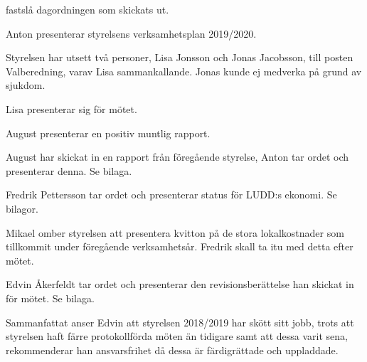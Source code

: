 \documentclass{protokoll}
\begin{document}
\newpage  


\begin{beslut}
     \att fastslå dagordningen som skickats ut.
\end{beslut}


Anton presenterar styrelsens verksamhetsplan 2019/2020. 

Styrelsen har utsett två personer, Lisa Jonsson och Jonas Jacobsson, till 
posten Valberedning, varav Lisa sammankallande. Jonas kunde ej medverka på
grund av sjukdom. 

Lisa presenterar sig för mötet. 


August presenterar en positiv muntlig rapport.

August har skickat in en rapport från föregående styrelse, Anton tar ordet och 
presenterar denna. Se bilaga.

Fredrik Pettersson tar ordet och presenterar status för LUDD:s ekonomi. 
Se bilagor.


Mikael omber styrelsen att presentera kvitton på de stora lokalkostnader som
tillkommit under föregående verksamhetsår. Fredrik skall ta itu med detta efter
mötet.

Edvin Åkerfeldt tar ordet och presenterar den revisionsberättelse han skickat
in för mötet. Se bilaga.


Sammanfattat anser Edvin att styrelsen 2018/2019 har skött sitt jobb, trots att
styrelsen haft färre protokollförda möten än tidigare samt att dessa varit
sena, rekommenderar han ansvarsfrihet då dessa är färdigrättade och uppladdade. 
\end{document}
